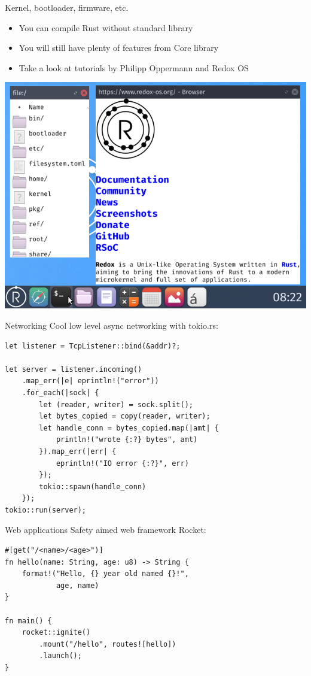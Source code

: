 \documentclass{beamer}
\begin{document}
	\begin{frame}{Kernel, bootloader, firmware, etc.}
		\begin{itemize}
			\item You can compile Rust without standard library
			\item You will still have plenty of features from Core library
			\item Take a look at tutorials by Philipp Oppermann and Redox OS
		\end{itemize}
		\includegraphics[height=0.5\textheight]{redox}
    \end{frame}

	\begin{frame}[fragile]{Networking}
		Cool low level async networking with tokio.rs:
        \small\begin{verbatim}
let listener = TcpListener::bind(&addr)?;

let server = listener.incoming()
	.map_err(|e| eprintln!("error"))
	.for_each(|sock| {
		let (reader, writer) = sock.split();
		let bytes_copied = copy(reader, writer);
		let handle_conn = bytes_copied.map(|amt| {
			println!("wrote {:?} bytes", amt)
		}).map_err(|err| {
			eprintln!("IO error {:?}", err)
		});
		tokio::spawn(handle_conn)
	});
tokio::run(server);
        \end{verbatim}
    \end{frame}

	\begin{frame}[fragile]{Web applications}
		Safety aimed web framework Rocket:
        \large\begin{verbatim}
#[get("/<name>/<age>")]
fn hello(name: String, age: u8) -> String {
	format!("Hello, {} year old named {}!",
			age, name)
}

fn main() {
	rocket::ignite()
		.mount("/hello", routes![hello])
		.launch();
}
        \end{verbatim}
    \end{frame}
\end{document}
